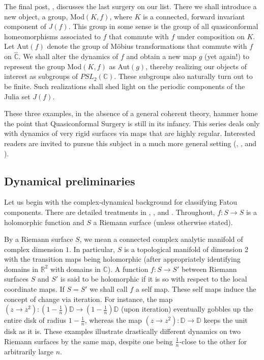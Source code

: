 \documentclass[11pt,a4paper]{article}
\begin{document}

        The final post, , discusses the last surgery on our list. There we shall introduce a new object, a group, Mod$(K, f)$, where $K$ is a connected, forward invariant component of $J(f)$. This group in some sense is the group of all quasiconformal homeomorphisms associated to $f$ that commute with $f$ under composition on $K$. Let Aut$(f)$ denote the group of M\"obius transformations that commute with $f$ on $\hat{\mathbb{C}}$. We shall alter the dynamics of $f$ and obtain a new map $g$ (yet again!) to represent the group Mod$(K, f)$ as Aut$(g)$, thereby realizing our objects of interest as subgroups of $PSL_2(\mathbb{C})$. These subgroups also naturally turn out to be finite. Such realizations shall shed light on the periodic components of the Julia set $J(f)$.

        These three examples, in the absence of a general coherent theory, hammer home the point that Quasiconformal Surgery is still in its infancy. This series deals only with dynamics of very rigid surfaces via maps that are highly regular. Interested readers are invited to pursue this subject in a much more general setting (\cite{katok1997introduction}, \cite{einsiedler2013ergodic}, and \cite{przytycki2010conformal}).

\subsection{Dynamical preliminaries}


        Let us begin with the complex-dynamical background for classifying Fatou components. There are detailed treatments in \cite{milnor2011dynamics}, \cite{mcmullen2016complex}, and \cite{carleson2013complex}. Throughout, $f: S \rightarrow S$ is a holomorphic function and $S$ a Riemann surface (unless otherwise stated).

        By a Riemann surface $S$, we mean a connected complex analytic manifold of complex dimension $1$. In particular, $S$ is a topological manifold of dimension 2 with the transition maps being holomorphic (after appropriately identifying domains in $\mathbb{R}^2$ with domains in $\mathbb{C}$). A function $f: S \rightarrow S'$ between Riemann surfaces $S$ and $S'$ is said to be holomorphic if it is so with respect to the local coordinate maps. If $S = S'$ we shall call $f$ a self map. These self maps induce the concept of change via iteration. For instance, the map $(z \rightarrow z^2) : (1 - \frac{1}{n})\mathbb{D} \rightarrow (1 - \frac{1}{n})\mathbb{D}$ (upon iteration) eventually gobbles up the entire disk of radius $1 - \frac{1}{n}$, whereas the map $(z \rightarrow z^2) : \mathbb{D} \rightarrow \mathbb{D}$ keeps the unit disk as it is. These examples illustrate drastically different dynamics on two Riemann surfaces by the same map, despite one being $\frac{1}{n}$-close to the other for arbitrarily large $n$.
\end{document}
